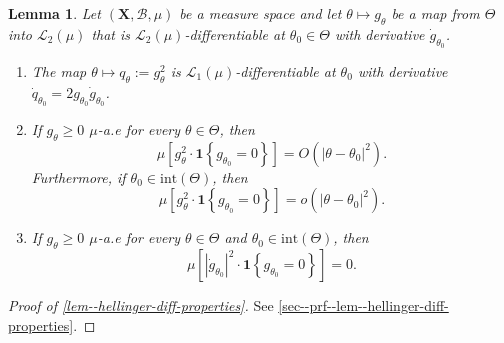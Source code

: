 \documentclass[12pt]{article}
\let\Cref\autoref
\def\L{\mathscr{L}}
\theoremstyle{definition}
\theoremstyle{plain}
\newtheorem{lemma}{Lemma}
\begin{document}
\begin{lemma}
\label{lem--hellinger-diff-properties}
Let \((\mathbf{X}, \mathcal{B}, \mu)\) be a measure space and let \(\theta
\mapsto g_{\theta}\) be a map from \(\Theta\) into \(\L_{2} (\mu)\)
that is \(\L_{2} (\mu)\)-differentiable at
\(\theta_{0} \in \Theta\) with derivative \(\dot{g}_{\theta_{0}}\).
\begin{enumerate}[label=(\alph*)]
  \item \label{lem--hellinger-diff-properties-q-diff-in-L1}
    The map \(\theta \mapsto q_{\theta} := g_{\theta}^{2}\) is \(\L_{1}
    (\mu)\)-differentiable at \(\theta_{0}\) with derivative \(\dot{q}_{\theta_{0}} = 2
    g_{\theta_{0}} \dot{g}_{\theta_{0}}\).
  \item \label{lem--hellinger-diff-properties-q-singularity-result}
    If \(g_{\theta} \geq 0\) \(\mu\)-a.e for every \(\theta \in \Theta\), then
    \begin{equation}
      \mu \left[ g_{\theta}^{2} \cdot \mathbf{1} \left\{ g_{\theta_{0}} = 0
      \right\} \right] = O \left( |\theta - \theta_{0}|^{2} \right).
      \label{eqn--hellinger-diff-properties-q-singularity-result-1}
    \end{equation}
    Furthermore, if \(\theta_{0} \in \mathrm{int} (\Theta)\), then
    \begin{equation}
      \mu \left[ g_{\theta}^{2} \cdot \mathbf{1} \left\{ g_{\theta_{0}} = 0
      \right\} \right] = o \left( |\theta - \theta_{0}|^{2} \right).
      \label{eqn--hellinger-diff-properties-q-singularity-result}
    \end{equation}
  \item \label{lem--hellinger-diff-properties-dotg-singularity-result}
    If \(g_{\theta} \geq 0\) \(\mu\)-a.e for every \(\theta \in \Theta\) and
    \(\theta_{0} \in \mathrm{int} (\Theta)\), then
    \begin{equation}
      \mu \left[ \left| \dot{g}_{\theta_{0}} \right|^{2} \cdot \mathbf{1}
      \left\{ g_{\theta_{0}} = 0 \right\} \right] = 0.
      \label{eqn--hellinger-diff-properties-gdot-singularity-result}
    \end{equation}
\end{enumerate}
\end{lemma}

\begin{proof}[Proof of \Cref{lem--hellinger-diff-properties}]
See \Cref{sec--prf--lem--hellinger-diff-properties}.
\end{proof}
\end{document}
